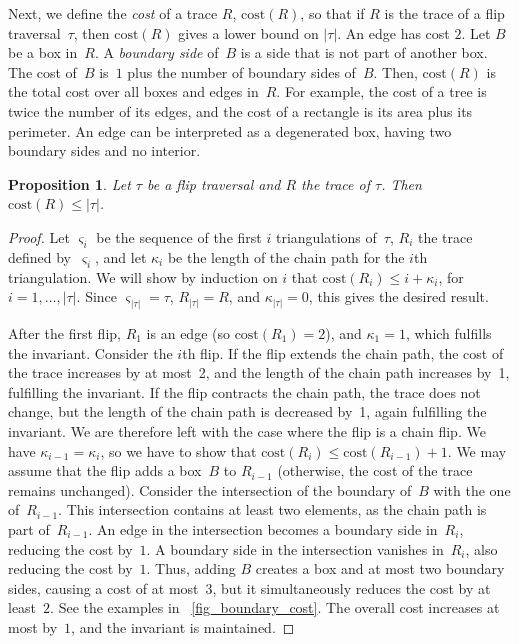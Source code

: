 \documentclass[a4paper,11pt]{article}
\newtheorem{proposition}[theorem]{Proposition}
\newcommand{\qedopt}{}
\begin{document}
Next, we define the \emph{cost} of a trace $R$, $\text{cost}(R)$, so that 
if $R$ is the trace of a flip traversal~$\tau$, then $\text{cost}(R)$ 
gives a lower bound on $|\tau|$. 
An edge has cost $2$.
Let $B$ be a box in~$R$.
A \emph{boundary side} of~$B$ is a side that is not part of another box.
The cost of~$B$ is~$1$ plus the number of boundary sides of~$B$.
Then, $\text{cost}(R)$ is the total cost over all boxes and edges in~$R$.
For example, the cost of a tree is twice the number of its edges, and the cost of 
a rectangle is its area plus its perimeter.
An edge can be interpreted as a degenerated box, having two boundary 
sides and no interior.

\begin{proposition}\label{prp_cost}
Let $\tau$ be a flip traversal and
$R$ the trace of  $\tau$. Then $\text{cost}(R) \leq |\tau|$.
\end{proposition}
\begin{proof}
Let $\varsigma_i$ be the sequence of the first $i$ triangulations of~$\tau$, $R_i$ the trace defined by~$\varsigma_i$, and let $\kappa_i$ be the length of the chain path for the $i$th triangulation.
We will show by induction on $i$ that $\text{cost}(R_i) \leq i + \kappa_i$, for $i = 1, \dots, |\tau|$.
Since $\varsigma_{|\tau|} = \tau$, $R_{|\tau|} = R$, and $\kappa_{|\tau|} = 0$, this gives the desired result.

After the first flip, $R_1$ is an edge (so $\text{cost}(R_1) = 2$), and $\kappa_1 = 1$, which fulfills the invariant.
Consider the $i$th flip.
If the flip extends the chain path, the cost of the trace increases by at most~2, and the length of the chain path increases by~1, fulfilling the invariant.
If the flip contracts the chain path, the trace does not change, but the length of the chain path is decreased by~1, again fulfilling the invariant.
We are therefore left with the case where the flip is a chain flip.
We have $\kappa_{i-1} = \kappa_i$, so we have to show that $\text{cost}(R_i) \leq \text{cost}(R_{i-1}) + 1$.
We may assume that the flip adds a box~$B$ to $R_{i-1}$ (otherwise,
the cost of the trace remains unchanged).
Consider the intersection of the boundary of~$B$ with the one of~$R_{i-1}$.
This intersection contains at least two elements, as the chain path is part of~$R_{i-1}$.
An edge in the intersection becomes a boundary side in~$R_i$, reducing the cost by~$1$.
A boundary side in the intersection vanishes in~$R_i$, also reducing the cost by~$1$.
Thus, adding $B$ creates a box and at most two boundary sides, causing a cost 
of at most~3, but it simultaneously reduces the cost by at least~$2$.
See the examples in \figurename~\ref{fig_boundary_cost}.
The overall cost increases at most by~$1$, and the invariant is maintained.
\qedopt
\end{proof}
\end{document}
